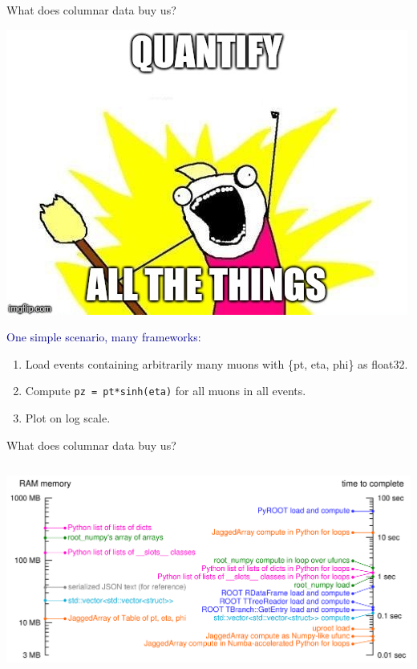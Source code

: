 \documentclass[aspectratio=169]{beamer}
\begin{document}
\begin{frame}{What does columnar data buy us?}
\begin{center}
\includegraphics[width=0.45\linewidth]{quantify.jpg}
\end{center}

\vspace{0.1 cm}
\textcolor{darkblue}{One simple scenario, many frameworks:}
\begin{enumerate}
\item Load events containing arbitrarily many muons with \{pt, eta, phi\} as float32.
\item Compute {\tt\small pz = pt*sinh(eta)} for all muons in all events.
\item Plot on log scale.
\end{enumerate}
\end{frame}

\begin{frame}{What does columnar data buy us?}
\vspace{0.3 cm}
\begin{columns}
\includegraphics[width=\linewidth]{logscales.pdf}
\end{columns}
\end{frame}
\end{document}
